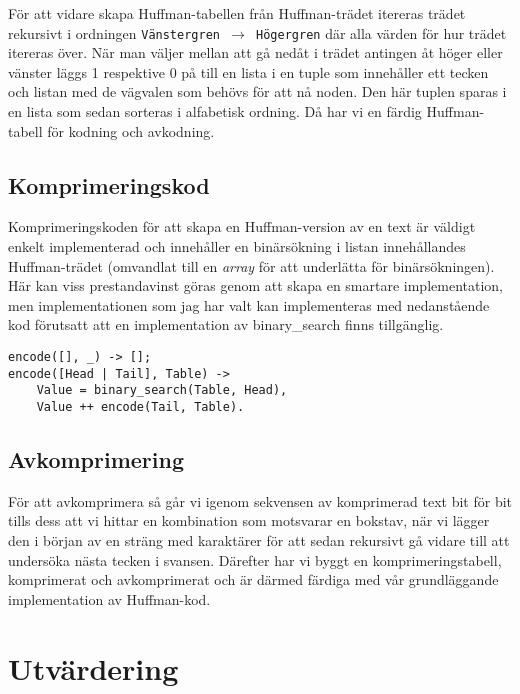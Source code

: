 \documentclass[a4paper, 11pt]{article}
\begin{document}
För att vidare skapa Huffman-tabellen från Huffman-trädet itereras trädet rekursivt i ordningen \texttt{Vänstergren $\rightarrow$ Högergren} där alla värden för hur trädet itereras över. När man väljer mellan att gå nedåt i trädet antingen åt höger eller vänster läggs 1 respektive 0 på till en lista i en tuple som innehåller ett tecken och listan med de vägvalen som behövs för att nå noden. Den här tuplen sparas i en lista som sedan sorteras i alfabetisk ordning. Då har vi en färdig Huffman-tabell för kodning och avkodning.

\subsection{Komprimeringskod}

Komprimeringskoden för att skapa en Huffman-version av en text är väldigt enkelt implementerad och innehåller en binärsökning i listan innehållandes Huffman-trädet (omvandlat till en \textit{array} för att underlätta för binärsökningen). Här kan viss prestandavinst göras genom att skapa en smartare implementation, men implementationen som jag har valt kan implementeras med nedanstående kod förutsatt att en implementation av binary\_search finns tillgänglig.

\begin{lstlisting}
encode([], _) -> [];                                                            
encode([Head | Tail], Table) ->                                                 
    Value = binary_search(Table, Head),                                         
    Value ++ encode(Tail, Table).  
\end{lstlisting}

\subsection{Avkomprimering}

För att avkomprimera så går vi igenom sekvensen av komprimerad text bit för bit tills dess att vi hittar en kombination som motsvarar en bokstav, när vi lägger den i början av en sträng med karaktärer för att sedan rekursivt gå vidare till att undersöka nästa tecken i svansen. Därefter har vi byggt en komprimeringstabell, komprimerat och avkomprimerat och är därmed färdiga med vår grundläggande implementation av Huffman-kod.

\section{Utvärdering}
\end{document}
